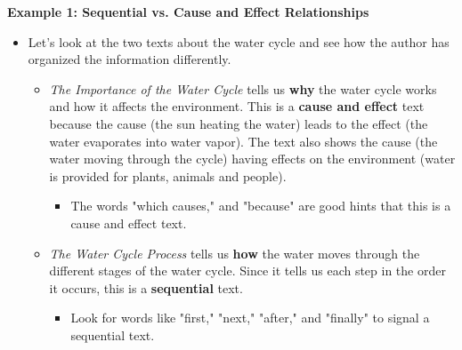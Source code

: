 \documentclass[12pt]{article}
\begin{document}
\begin{tcolorbox}[colframe=black!60, colback=white, 
coltitle=black, colbacktitle=black!15, fonttitle=\bfseries\Large, 
title=Examples, halign title=center, left=10pt, right=10pt, top=10pt, bottom=15pt]

\textbf{Example 1: Sequential vs. Cause and Effect Relationships}
\begin{itemize}

    \item Let's look at the two texts about the water cycle and see how the author has organized the information differently.
    \begin{itemize}
        \item \textit{The Importance of the Water Cycle} tells us \textbf{why} the water cycle works and how it affects the environment. This is a \textbf{cause and effect} text because the cause (the sun heating the water) leads to the effect (the water evaporates into water vapor). The text also shows the cause (the water moving through the cycle) having effects on the environment (water is provided for plants, animals and people).
        \begin{itemize}
            \item The words "which causes," and "because" are good hints that this is a cause and effect text.
        \end{itemize}
            
        \item \textit{The Water Cycle Process} tells us \textbf{how} the water moves through the different stages of the water cycle. Since it tells us each step in the order it occurs, this is a \textbf{sequential} text.
        \begin{itemize}
            \item Look for words like "first," "next," "after," and "finally" to signal a sequential text.
        \end{itemize}
        
    \end{itemize}
\end{itemize}

\end{tcolorbox}
\end{document}
